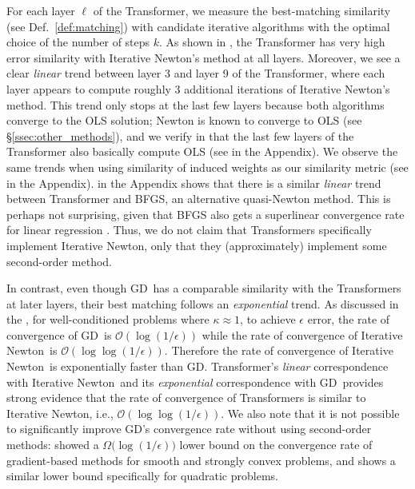 \documentclass[11pt]{article}
\theoremstyle{plain}
\theoremstyle{definition}
\theoremstyle{remark}
\renewcommand{\^}[1]{^{(#1)}}
\newcommand{\newton}{Iterative Newton}
\begin{document}
For each layer $\ell$ of the Transformer,
we measure the best-matching similarity (see Def.~\ref{def:matching}) with candidate iterative algorithms with the optimal choice of the number of steps $k$.
As shown in , the Transformer has very high error similarity with \newton's method at all layers.
Moreover, we see a clear \emph{linear} trend between layer 3 and layer 9 of the Transformer, where each layer appears to compute roughly 3 additional iterations of \newton's method.
This trend only stops at the last few layers because both algorithms converge to the OLS solution;
Newton is known to converge to OLS (see \S\ref{ssec:other_methods}), and we verify in  that the last few layers of the Transformer also basically compute OLS (see  in the Appendix). 
We observe the same trends when using similarity of induced weights as our similarity metric (see  in the Appendix). in the Appendix shows that there is a similar \textit{linear} trend between Transformer and BFGS, an alternative quasi-Newton method. This is perhaps not surprising, given that BFGS also gets a superlinear convergence rate for linear regression \cite{nocedal1999numerical}.
Thus, we do not claim that Transformers specifically implement \newton, only that they (approximately) implement some second-order method.

In contrast, even though GD\ has a comparable similarity with the Transformers at later layers, their best matching follows an \textit{exponential} trend. As discussed in the , for well-conditioned problems where  $\kappa \approx 1$, to achieve $\epsilon$ error, the rate of convergence of GD\ is $\mathcal{O}(\log (1/\epsilon))$ while the rate of convergence of \newton\ is $\mathcal{O}(\log \log (1/\epsilon))$. Therefore the rate of convergence of \newton\ is exponentially faster than GD.  Transformer's \textit{linear} correspondence with \newton\ and its \textit{exponential} correspondence with GD\ provides strong evidence   that the rate of convergence of Transformers is similar to \newton, i.e., $\mathcal O(\log \log (1/\epsilon))$. We also note that it is not possible to significantly improve GD's convergence rate without using second-order methods: \citet{nemirovskii1983problem} showed a $ \Omega\big( \log(1/\epsilon) \big)$  lower bound on the convergence rate of gradient-based methods for smooth and strongly convex problems, and \cite{Arjevani2016OnLower} shows a similar lower bound specifically for quadratic problems. 
\end{document}
